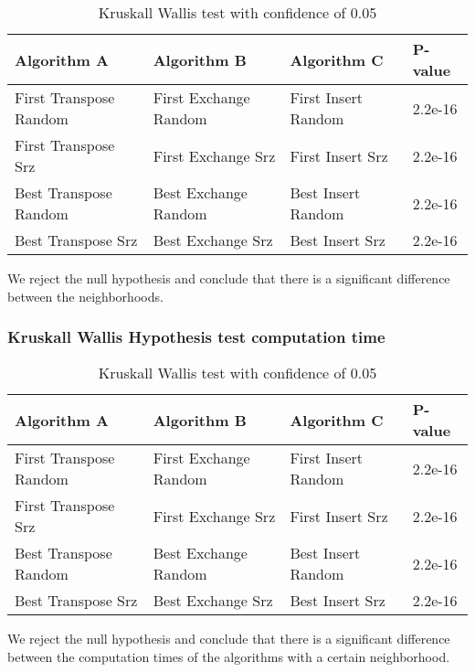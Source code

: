 \documentclass[]{article}
\begin{document}
	\begin{table}[H]
		\centering
		\caption{Kruskall Wallis test with confidence of 0.05}
		\label{tab:table1}
		\begin{tabular}{llll}
			\toprule
			Algorithm A & Algorithm B & Algorithm C & P-value\\
			\midrule
			First Transpose Random&First Exchange Random& First Insert Random&\color{OliveGreen}2.2e-16\\ 
			First Transpose Srz&First Exchange Srz& First Insert Srz&\color{OliveGreen}2.2e-16\\
			Best Transpose Random&Best Exchange Random& Best Insert Random&\color{OliveGreen}2.2e-16\\
			Best Transpose Srz&Best Exchange Srz& Best Insert Srz&\color{OliveGreen}2.2e-16\\
			
			\bottomrule
		\end{tabular}
	\end{table}
	
	We reject the null hypothesis and conclude that there is a significant difference between the neighborhoods.
	
	\subsubsection{Kruskall Wallis Hypothesis test computation time}
	
	\begin{table}[H]
		\centering
		\caption{Kruskall Wallis test with confidence of 0.05}
		\label{tab:table1}
		\begin{tabular}{llll}
			\toprule
			Algorithm A & Algorithm B & Algorithm C & P-value\\
			\midrule
			First Transpose Random&First Exchange Random& First Insert Random&\color{OliveGreen}2.2e-16\\ 
			First Transpose Srz&First Exchange Srz& First Insert Srz&\color{OliveGreen}2.2e-16\\
			Best Transpose Random&Best Exchange Random& Best Insert Random&\color{OliveGreen}2.2e-16\\
			Best Transpose Srz&Best Exchange Srz& Best Insert Srz&\color{OliveGreen}2.2e-16\\
			
			\bottomrule
		\end{tabular}
	\end{table}
	
	We reject the null hypothesis and conclude that there is a significant difference between the computation times of the algorithms with a certain neighborhood.
	
\end{document}
